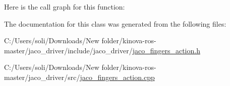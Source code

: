 Here is the call graph for this function\+:




The documentation for this class was generated from the following files\+:\begin{DoxyCompactItemize}
\item 
C\+:/\+Users/soli/\+Downloads/\+New folder/kinova-\/ros-\/master/jaco\+\_\+driver/include/jaco\+\_\+driver/\hyperlink{jaco__fingers__action_8h}{jaco\+\_\+fingers\+\_\+action.\+h}\item 
C\+:/\+Users/soli/\+Downloads/\+New folder/kinova-\/ros-\/master/jaco\+\_\+driver/src/\hyperlink{jaco__fingers__action_8cpp}{jaco\+\_\+fingers\+\_\+action.\+cpp}\end{DoxyCompactItemize}
